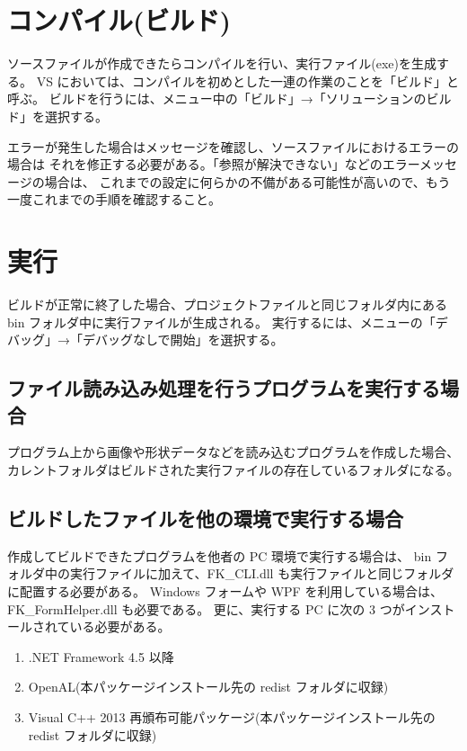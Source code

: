 \documentclass[a4j]{jarticle}
\begin{document}
\section{コンパイル(ビルド)}
ソースファイルが作成できたらコンパイルを行い、実行ファイル(exe)を生成する。
VS においては、コンパイルを初めとした一連の作業のことを「ビルド」と呼ぶ。
ビルドを行うには、メニュー中の「ビルド」→「ソリューションのビルド」を選択する。

エラーが発生した場合はメッセージを確認し、ソースファイルにおけるエラーの場合は
それを修正する必要がある。「参照が解決できない」などのエラーメッセージの場合は、
これまでの設定に何らかの不備がある可能性が高いので、もう一度これまでの手順を確認すること。


\section{実行}
ビルドが正常に終了した場合、プロジェクトファイルと同じフォルダ内にある 
bin フォルダ中に実行ファイルが生成される。
実行するには、メニューの「デバッグ」→「デバッグなしで開始」を選択する。

\subsection{ファイル読み込み処理を行うプログラムを実行する場合}
プログラム上から画像や形状データなどを読み込むプログラムを作成した場合、
カレントフォルダはビルドされた実行ファイルの存在しているフォルダになる。

\subsection{ビルドしたファイルを他の環境で実行する場合}
作成してビルドできたプログラムを他者の PC 環境で実行する場合は、
bin フォルダ中の実行ファイルに加えて、FK\_CLI.dll も実行ファイルと同じフォルダに配置する必要がある。
Windows フォームや WPF を利用している場合は、FK\_FormHelper.dll も必要である。
更に、実行する PC に次の 3 つがインストールされている必要がある。

\begin{enumerate}
\item .NET Framework 4.5 以降
\item OpenAL(本パッケージインストール先の redist フォルダに収録)
\item Visual C++ 2013 再頒布可能パッケージ(本パッケージインストール先の redist フォルダに収録)
\end{enumerate}
\end{document}

